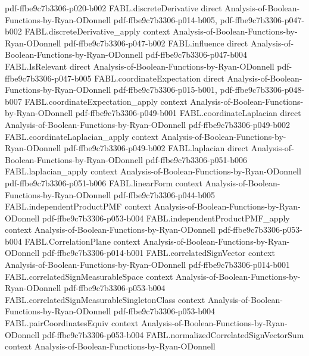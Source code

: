 \begin{theorem}
  {pdf-ffbe9c7b3306-p020-b002}
\proofstep
  {FABL.discreteDerivative}
  {direct}
  {Analysis-of-Boolean-Functions-by-Ryan-ODonnell}
  {pdf-ffbe9c7b3306-p014-b005,
    pdf-ffbe9c7b3306-p047-b002}
\proofstep
  {FABL.discreteDerivative_apply}
  {context}
  {Analysis-of-Boolean-Functions-by-Ryan-ODonnell}
  {pdf-ffbe9c7b3306-p047-b002}
\proofstep
  {FABL.influence}
  {direct}
  {Analysis-of-Boolean-Functions-by-Ryan-ODonnell}
  {pdf-ffbe9c7b3306-p047-b004}
\proofstep
  {FABL.IsRelevant}
  {direct}
  {Analysis-of-Boolean-Functions-by-Ryan-ODonnell}
  {pdf-ffbe9c7b3306-p047-b005}
\proofstep
  {FABL.coordinateExpectation}
  {direct}
  {Analysis-of-Boolean-Functions-by-Ryan-ODonnell}
  {pdf-ffbe9c7b3306-p015-b001,
    pdf-ffbe9c7b3306-p048-b007}
\proofstep
  {FABL.coordinateExpectation_apply}
  {context}
  {Analysis-of-Boolean-Functions-by-Ryan-ODonnell}
  {pdf-ffbe9c7b3306-p049-b001}
\proofstep
  {FABL.coordinateLaplacian}
  {direct}
  {Analysis-of-Boolean-Functions-by-Ryan-ODonnell}
  {pdf-ffbe9c7b3306-p049-b002}
\proofstep
  {FABL.coordinateLaplacian_apply}
  {context}
  {Analysis-of-Boolean-Functions-by-Ryan-ODonnell}
  {pdf-ffbe9c7b3306-p049-b002}
\proofstep
  {FABL.laplacian}
  {direct}
  {Analysis-of-Boolean-Functions-by-Ryan-ODonnell}
  {pdf-ffbe9c7b3306-p051-b006}
\proofstep
  {FABL.laplacian_apply}
  {context}
  {Analysis-of-Boolean-Functions-by-Ryan-ODonnell}
  {pdf-ffbe9c7b3306-p051-b006}
\proofstep
  {FABL.linearForm}
  {context}
  {Analysis-of-Boolean-Functions-by-Ryan-ODonnell}
  {pdf-ffbe9c7b3306-p044-b005}
\proofstep
  {FABL.independentProductPMF}
  {context}
  {Analysis-of-Boolean-Functions-by-Ryan-ODonnell}
  {pdf-ffbe9c7b3306-p053-b004}
\proofstep
  {FABL.independentProductPMF_apply}
  {context}
  {Analysis-of-Boolean-Functions-by-Ryan-ODonnell}
  {pdf-ffbe9c7b3306-p053-b004}
\proofstep
  {FABL.CorrelationPlane}
  {context}
  {Analysis-of-Boolean-Functions-by-Ryan-ODonnell}
  {pdf-ffbe9c7b3306-p014-b001}
\proofstep
  {FABL.correlatedSignVector}
  {context}
  {Analysis-of-Boolean-Functions-by-Ryan-ODonnell}
  {pdf-ffbe9c7b3306-p014-b001}
\proofstep
  {FABL.correlatedSignMeasurableSpace}
  {context}
  {Analysis-of-Boolean-Functions-by-Ryan-ODonnell}
  {pdf-ffbe9c7b3306-p053-b004}
\proofstep
  {FABL.correlatedSignMeasurableSingletonClass}
  {context}
  {Analysis-of-Boolean-Functions-by-Ryan-ODonnell}
  {pdf-ffbe9c7b3306-p053-b004}
\proofstep
  {FABL.pairCoordinatesEquiv}
  {context}
  {Analysis-of-Boolean-Functions-by-Ryan-ODonnell}
  {pdf-ffbe9c7b3306-p053-b004}
\proofstep
  {FABL.normalizedCorrelatedSignVectorSum}
  {context}
  {Analysis-of-Boolean-Functions-by-Ryan-ODonnell}

\end{theorem}
